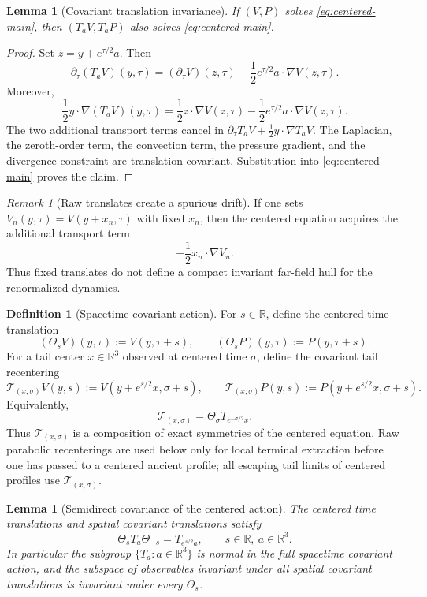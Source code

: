 \documentclass[11pt]{amsart}
\numberwithin{equation}{section}
\theoremstyle{plain}
\newtheorem{lemma}[theorem]{Lemma}
\theoremstyle{definition}
\newtheorem{definition}[theorem]{Definition}
\theoremstyle{remark}
\newtheorem{remark}[theorem]{Remark}
\newcommand{\R}{\mathbb R}
\begin{document}
\begin{lemma}[Covariant translation invariance]
\label{lem:covariant-translation-invariance}
If \((V,P)\) solves \eqref{eq:centered-main}, then
\((T_aV,T_aP)\) also solves \eqref{eq:centered-main}.
\end{lemma}

\begin{proof}
Set \(z=y+e^{\tau/2}a\).  Then
\[
   \partial_\tau(T_aV)(y,\tau)
   =
   (\partial_\tau V)(z,\tau)
   +\frac12e^{\tau/2}a\cdot\nabla V(z,\tau).
\]
Moreover,
\[
   \frac12 y\cdot\nabla(T_aV)(y,\tau)
   =
   \frac12 z\cdot\nabla V(z,\tau)
   -\frac12e^{\tau/2}a\cdot\nabla V(z,\tau).
\]
The two additional transport terms cancel in
\(\partial_\tau T_aV+\frac12y\cdot\nabla T_aV\).  The Laplacian, the
zeroth-order term, the convection term, the pressure gradient, and the
divergence constraint are translation covariant.  Substitution into
\eqref{eq:centered-main} proves the claim.
\end{proof}

\begin{remark}[Raw translates create a spurious drift]
\label{rem:raw-translates}
If one sets \(V_n(y,\tau)=V(y+x_n,\tau)\) with fixed \(x_n\), then the centered
equation acquires the additional transport term
\[
   -\frac12 x_n\cdot\nabla V_n .
\]
Thus fixed translates do not define a compact invariant far-field hull for the
renormalized dynamics.
\end{remark}

\begin{definition}[Spacetime covariant action]
\label{def:spacetime-covariant-action}
For \(s\in\R\), define the centered time translation
\[
   (\Theta_sV)(y,\tau):=V(y,\tau+s),
   \qquad
   (\Theta_sP)(y,\tau):=P(y,\tau+s).
\]
For a tail center \(x\in\R^3\) observed at centered time \(\sigma\), define the
covariant tail recentering
\[
   \mathscr T_{(x,\sigma)}V(y,s)
   :=V(y+e^{s/2}x,\sigma+s),
   \qquad
   \mathscr T_{(x,\sigma)}P(y,s)
   :=P(y+e^{s/2}x,\sigma+s).
\]
Equivalently,
\[
   \mathscr T_{(x,\sigma)}
   =
   \Theta_\sigma T_{e^{-\sigma/2}x}.
\]
Thus \(\mathscr T_{(x,\sigma)}\) is a composition of exact symmetries of the
centered equation.  Raw parabolic recenterings are used below only for local
terminal extraction before one has passed to a centered ancient profile; all
escaping tail limits of centered profiles use \(\mathscr T_{(x,\sigma)}\).
\end{definition}

\begin{lemma}[Semidirect covariance of the centered action]
\label{lem:semidirect-covariance}
The centered time translations and spatial covariant translations satisfy
\[
   \Theta_sT_a\Theta_{-s}=T_{e^{s/2}a},
   \qquad s\in\R,\ a\in\R^3.
\]
In particular the subgroup \(\{T_a:a\in\R^3\}\) is normal in the full
spacetime covariant action, and the subspace of observables invariant under all
spatial covariant translations is invariant under every \(\Theta_s\).
\end{lemma}
\end{document}
